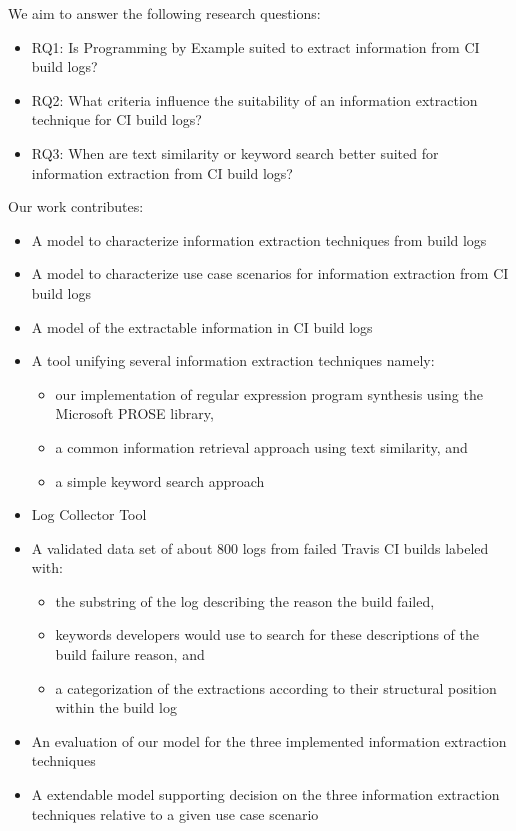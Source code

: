 \documentclass[\myrootdir/main.tex]{subfiles}
\begin{document}

We aim to answer the following research questions:

\begin{itemize}
  \item{RQ1:} Is Programming by Example suited to extract information from CI build logs?
  \item{RQ2:} What criteria influence the suitability of an information extraction technique for CI build logs?
  \item{RQ3:} When are text similarity or keyword search better suited for information extraction from CI build logs?
\end{itemize}


Our work contributes:

\begin{itemize}
  \item A model to characterize information extraction techniques from  build logs
  \item A model to characterize use case scenarios for information extraction from CI build logs
  \item A model of the extractable information in CI build logs
  \item A tool unifying several information extraction techniques namely:
        \begin{itemize}
          \item our implementation of regular expression program synthesis using the Microsoft PROSE library,
          \item a common information retrieval approach using text similarity, and
          \item a simple keyword search approach
        \end{itemize}
  \item Log Collector Tool
  \item A validated data set of about 800 logs from failed Travis CI builds labeled with:
        \begin{itemize}
          \item the substring of the log describing the reason the build failed,
          \item keywords developers would use to search for these descriptions of the build failure reason, and
          \item a categorization of the extractions according to their structural position within the build log
        \end{itemize}
  \item An evaluation of our model for the three implemented information extraction techniques 
  \item A extendable model  supporting decision on the three information extraction techniques relative to a given use case scenario
\end{itemize}
\end{document}
